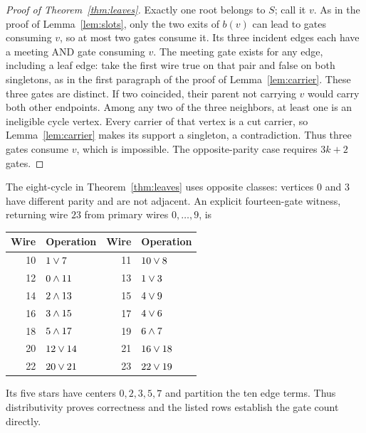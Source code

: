 \begin{proof}[Proof of Theorem~\ref{thm:leaves}]
Exactly one root belongs to $S$; call it $v$. As in the proof of
Lemma~\ref{lem:slots}, only the two exits of $b(v)$ can
lead to gates consuming $v$, so at most two gates consume it. Its three
incident edges each have a meeting AND gate consuming $v$.
The meeting gate exists for any edge, including a leaf edge: take the
first wire true on that pair and false on both singletons, as in the
first paragraph of the proof of Lemma~\ref{lem:carrier}.
These three gates are distinct. If two coincided, their parent not
carrying $v$ would carry both other endpoints. Among any two of the
three neighbors, at least one is an ineligible cycle vertex. Every
carrier of that vertex is a cut carrier, so Lemma~\ref{lem:carrier}
makes its support a singleton, a contradiction. Thus three gates
consume $v$, which is impossible. The opposite-parity case requires
$3k+2$ gates.
\end{proof}

The eight-cycle in Theorem~\ref{thm:leaves} uses opposite classes: vertices $0$ and $3$
have different parity and are not adjacent. An explicit fourteen-gate
witness, returning wire $23$ from primary wires $0,\ldots,9$, is
\begin{center}
\begin{minipage}{0.9\linewidth}
\centering
\begin{tabular}{rl@{\qquad}rl}
\toprule
Wire&Operation&Wire&Operation\\
\midrule
10&$1\mathbin{\vee}7$&11&$10\mathbin{\vee}8$\\
12&$0\mathbin{\wedge}11$&13&$1\mathbin{\vee}3$\\
14&$2\mathbin{\wedge}13$&15&$4\mathbin{\vee}9$\\
16&$3\mathbin{\wedge}15$&17&$4\mathbin{\vee}6$\\
18&$5\mathbin{\wedge}17$&19&$6\mathbin{\wedge}7$\\
20&$12\mathbin{\vee}14$&21&$16\mathbin{\vee}18$\\
22&$20\mathbin{\vee}21$&23&$22\mathbin{\vee}19$\\
\bottomrule
\end{tabular}
\end{minipage}
\end{center}
Its five stars have centers $0,2,3,5,7$ and partition the ten edge terms.
Thus distributivity proves correctness and the listed rows establish the
gate count directly.
